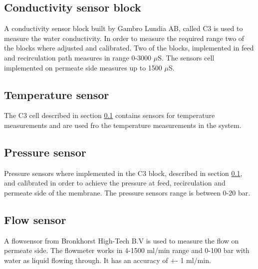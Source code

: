 \subsection{Conductivity sensor block}
\label{senscond}
A conductivity sensor block built by Gambro Lundia AB, called C3 is used to measure the water conductivity. In order to measure the required range two of the blocks where adjusted and calibrated. Two of the blocks, implemented in feed and recirculation path measures in range 0-3000 $\mu$S. The sensors cell implemented on permeate side measures up to 1500 $\mu$S.

\subsection{Temperature sensor}
\label{senstemp}
The C3 cell described in section \ref{senscond} contains sensors for temperature measurements and are used fro the temperature measurements in the system.

\subsection{Pressure sensor}
\label{senspress}
Pressure sensors where implemented in the C3 block, described in section \ref{senscond}, and calibrated in order to achieve the pressure at feed, recirculation and permeate side of the membrane. The pressure sensors range is between 0-20 bar.


\subsection{Flow sensor}
\label{sensflow}
A flowsensor from Bronkhorst High-Tech B.V is used to measure the flow on permeate side. The flowmeter works in 4-1500 ml/min range and 0-100 bar with water as liquid flowing through. It has an accuracy of +- 1 ml/min. 









